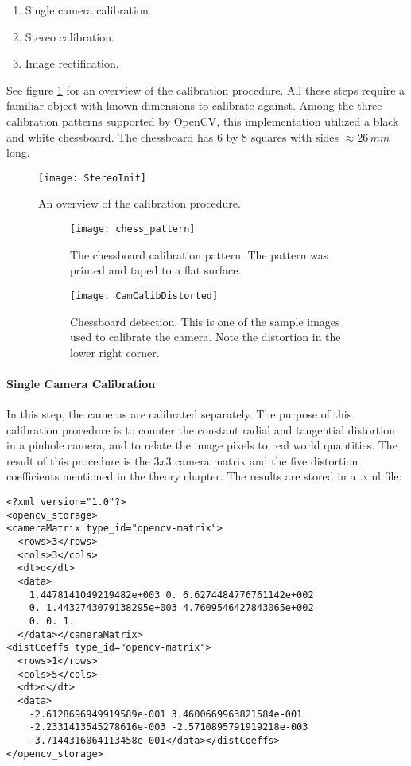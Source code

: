 \begin{enumerate}
	\item Single camera calibration.
	\item Stereo calibration.
	\item Image rectification.
\end{enumerate}

See figure \ref{fig:calibproc} for an overview of the calibration procedure. All these steps require a familiar object with known dimensions to calibrate against. Among the three calibration patterns supported by OpenCV, this implementation utilized a black and white chessboard. The chessboard has 6 by 8 squares with sides $\approx 26 \, mm$ long.

\begin{figure}
	\texttt{[image: StereoInit]}
	\caption{An overview of the calibration procedure.}
	\label{fig:calibproc}
\end{figure}

\begin{figure}
	\centering
	\begin{subfigure}[b]{0.90\textwidth}
		\texttt{[image: chess\_pattern]}
		\caption{The chessboard calibration pattern. The pattern was printed and taped to a flat surface.}
		\label{fig:chesspattern}
	\end{subfigure}
	\begin{subfigure}[b]{0.90\textwidth}
		\texttt{[image: CamCalibDistorted]}
		\caption{Chessboard detection. This is one of the sample images used to calibrate the camera. Note the distortion in the lower right corner.}
		\label{fig:chessdetection}
	\end{subfigure}
	\caption{\label{fig:calibrationpattern}}
\end{figure}

\paragraph{Single Camera Calibration}

In this step, the cameras are calibrated separately.  The purpose of this calibration procedure is to counter the constant radial and tangential distortion in a pinhole camera, and to relate the image pixels to real world quantities. The result of this procedure is the $3x3$ camera matrix and the five distortion coefficients mentioned in the theory chapter. The results are stored in a .xml file:

\begin{verbatim}
<?xml version="1.0"?>
<opencv_storage>
<cameraMatrix type_id="opencv-matrix">
  <rows>3</rows>
  <cols>3</cols>
  <dt>d</dt>
  <data>
    1.4478141049219482e+003 0. 6.6274484776761142e+002 
    0. 1.4432743079138295e+003 4.7609546427843065e+002 
    0. 0. 1.
  </data></cameraMatrix>
<distCoeffs type_id="opencv-matrix">
  <rows>1</rows>
  <cols>5</cols>
  <dt>d</dt>
  <data>
    -2.6128696949919589e-001 3.4600669963821584e-001
    -2.2331413545278616e-003 -2.5710895791919218e-003
    -3.7144316064113458e-001</data></distCoeffs>
</opencv_storage>
\end{verbatim}

